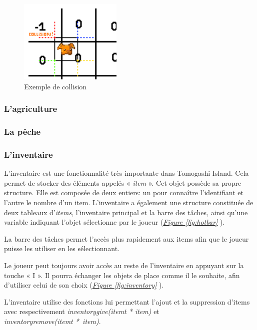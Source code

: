 \documentclass{article}
\begin{document}
        \begin{figure}[!h]  
            \includegraphics[height = 4cm]{exermple_collision.png}
            \centering
            \caption{Exemple de collision}
            \label{fig:collions}
        \end{figure}
        
        \subsubsection{L'agriculture}
        
        \subsubsection{La pêche}
        
        \subsubsection{L'inventaire}
        L'inventaire est une fonctionnalité très importante dans Tomogashi Island. Cela permet de stocker des éléments appelés « \textit{item} ». Cet objet possède sa propre structure. Elle est composée de deux entiers: un pour connaître l'identifiant et l'autre le nombre d'un item.
        L'inventaire a également une structure constituée de deux tableaux d'\textit{items}, l'inventaire principal et la barre des tâches, ainsi qu'une variable indiquant l'objet sélectionne par le joueur (\textit{\hyperref[fig:hotbar]{Figure \ref{fig:hotbar}}} ).

        La barre des tâches permet l'accès plus rapidement aux items afin que le joueur puisse les utiliser en les sélectionnant. 

        Le joueur peut toujours avoir accès au reste de l'inventaire en appuyant sur la touche « I ». Il pourra échanger les objets de place comme il le souhaite, afin d'utiliser celui de son choix (\textit{\hyperref[fig:inventory]{Figure \ref{fig:inventory}}} ).

        L'inventaire utilise des fonctions lui permettant l'ajout et la suppression d'items avec respectivement \textit{inventory\textunderscore give(item\textunderscore t * item)} et \\ \textit{inventory\textunderscore remove(item\textunderscore t *~item)}. 
        
\end{document}
